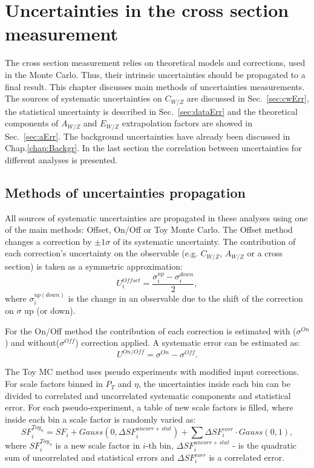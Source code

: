 \chapter{Uncertainties in the cross section measurement}\label{chap:Unc}
\minitoc
The cross section measurement relies on theoretical models and corrections, used in the Monte Carlo. Thus, their intrinsic uncertainties should be propagated to a final result. This chapter discusses main methods of uncertainties measurements. The sources of systematic uncertainties on $C_{W/Z}$ are discussed in Sec.~\ref{sec:cwErr}, the statistical uncertainty is described in Sec.~\ref{sec:dataErr} and the theoretical components of  $A_{W/Z}$ and $E_{W/Z}$ extrapolation factors are showed in Sec.~\ref{sec:aErr}. The background uncertainties have already been discussed in Chap.\ref{chap:Backgr}. In the last section the correlation between uncertainties for different analyses is presented.

\section{Methods of uncertainties propagation}
All sources of systematic uncertainties are propagated in these analyses using one of the main methods: Offset, On/Off or Toy Monte Carlo. The Offset method changes a correction by   $\pm 1\sigma$ of its systematic uncertainty. The contribution of each correction's uncertainty on the observable (e.g. $C_{W/Z}$, $A_{W/Z}$ or a cross section) is taken as a symmetric approximation:
\begin{equation}
U_i^{Offset}=\frac{\sigma_{i}^{up}-\sigma_{i}^{down}}{2},
\end{equation}
where $\sigma_{i}^{up(down)}$ is the change in an observable due to the shift of the correction on $\sigma$ up (or down). 

For the On/Off method the contribution of each correction is estimated with ($\sigma^{On}$) and without($\sigma^{Off}$) correction applied. A systematic error can be estimated as:
\begin{equation}
U^{On/Off}=\sigma^{On}-\sigma^{Off}.
\end{equation}

The Toy MC method\cite{ToyMC} uses pseudo experiments with modified input corrections. For scale factors binned in $P_T$ and $\eta$, the uncertainties inside each bin can be divided to correlated  and uncorrelated systematic components and statistical error. For each pseudo-experiment, a table of new scale factors is filled, where inside each bin a scale factor is randomly varied as:
\begin{equation}\label{eq:ToyMethod}
SF_{i}^{Toy_{n}} = SF_{i}+ Gauss(0,\Delta SF_{i} ^{uncorr+stat}) + \sum \Delta SF_{i} ^{corr} \cdot Gauss(0, 1),
\end{equation}
where $SF_{i}^{Toy_{n}}$ is a new scale factor in $i$-th bin, $\Delta SF_{i} ^{uncorr+stat}$ - is the quadratic sum of uncorrelated and statistical errors and $\Delta SF_{i} ^{corr}$ is a correlated error.

